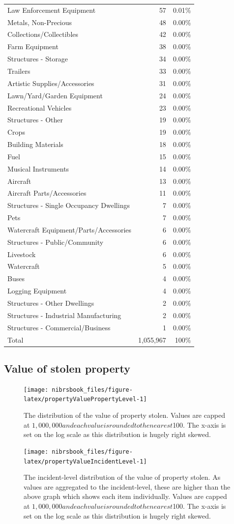 \documentclass[
  12pt,
  openany]{book}
\begin{document}
\begin{longtable}[]{@{}lrr@{}}
Law Enforcement Equipment & 57 & 0.01\%\tabularnewline
Metals, Non-Precious & 48 & 0.00\%\tabularnewline
Collections/Collectibles & 42 & 0.00\%\tabularnewline
Farm Equipment & 38 & 0.00\%\tabularnewline
Structures - Storage & 34 & 0.00\%\tabularnewline
Trailers & 33 & 0.00\%\tabularnewline
Artistic Supplies/Accessories & 31 & 0.00\%\tabularnewline
Lawn/Yard/Garden Equipment & 24 & 0.00\%\tabularnewline
Recreational Vehicles & 23 & 0.00\%\tabularnewline
Structures - Other & 19 & 0.00\%\tabularnewline
Crops & 19 & 0.00\%\tabularnewline
Building Materials & 18 & 0.00\%\tabularnewline
Fuel & 15 & 0.00\%\tabularnewline
Musical Instruments & 14 & 0.00\%\tabularnewline
Aircraft & 13 & 0.00\%\tabularnewline
Aircraft Parts/Accessories & 11 & 0.00\%\tabularnewline
Structures - Single Occupancy Dwellings & 7 & 0.00\%\tabularnewline
Pets & 7 & 0.00\%\tabularnewline
Watercraft Equipment/Parts/Accessories & 6 & 0.00\%\tabularnewline
Structures - Public/Community & 6 & 0.00\%\tabularnewline
Livestock & 6 & 0.00\%\tabularnewline
Watercraft & 5 & 0.00\%\tabularnewline
Buses & 4 & 0.00\%\tabularnewline
Logging Equipment & 4 & 0.00\%\tabularnewline
Structures - Other Dwellings & 2 & 0.00\%\tabularnewline
Structures - Industrial Manufacturing & 2 & 0.00\%\tabularnewline
Structures - Commercial/Business & 1 & 0.00\%\tabularnewline
Total & 1,055,967 & 100\%\tabularnewline
\bottomrule
\end{longtable}

\hypertarget{value-of-stolen-property}{%
\subsection{Value of stolen property}\label{value-of-stolen-property}}

\begin{figure}

{\centering \texttt{[image: nibrsbook\_files/figure-latex/propertyValuePropertyLevel-1]} 

}

\caption{The distribution of the value of property stolen. Values are capped at $1,000,000 and each value is rounded to the nearest $100. The x-axis is set on the log scale as this distribution is hugely right skewed.}\label{fig:propertyValuePropertyLevel}
\end{figure}

\begin{figure}

{\centering \texttt{[image: nibrsbook\_files/figure-latex/propertyValueIncidentLevel-1]} 

}

\caption{The incident-level distribution of the value of property stolen. As values are aggregated to the incident-level, these are higher than the above graph which shows each item individually. Values are capped at $1,000,000 and each value is rounded to the nearest $100. The x-axis is set on the log scale as this distribution is hugely right skewed.}\label{fig:propertyValueIncidentLevel}
\end{figure}
\end{document}
